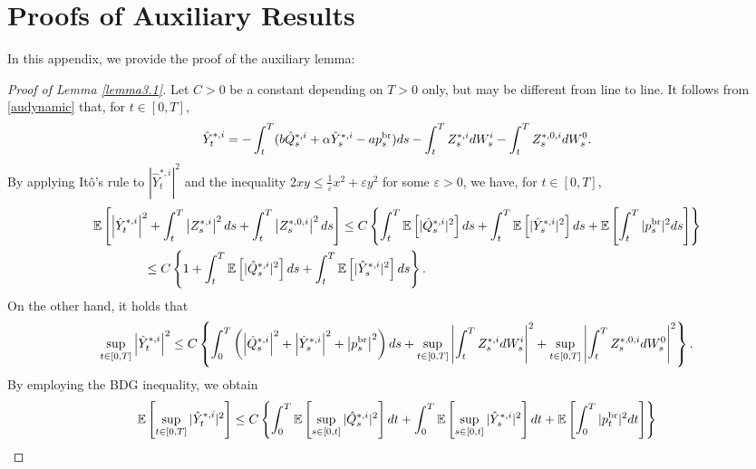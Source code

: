 \documentclass[11pt]{article}
\numberwithin{equation}{section}
\begin{document}
\appendix
\section{Proofs of Auxiliary Results}\label{sec:appendix}   	

In this appendix, we provide the proof of the auxiliary lemma:
{\small 
\begin{proof}[Proof of Lemma \ref{lemma3.1}]
Let $C>0$ be a constant depending on $T>0$ only, but may be different from line to line. It follows from \eqref{audynamic} that, for $t\in[0,T]$,
\begin{align*}
\hat{Y}_t^{*, i}=-\int_t^T(b \hat{Q}_s^{*, i}+\alpha  \hat{Y}_s^{*, i}-a p_s^{{\rm br}})ds-\int_t^T Z_s^{*,i}dW_s^i-\int_t^TZ_s^{*, 0, i}dW_s^0.    
\end{align*}
By applying It\^o’s rule to $|\hat{Y}_t^{*,i}|^2$ and %
the inequality $2xy\leq \frac{1}{\varepsilon}x^2+\varepsilon y^2$ for some $\varepsilon>0$, we have, for $t\in[0,T]$,
\begin{align*}
&\mathbb{E}\left[\left|\hat{Y}_t^{*, i}\right|^2+\int_t^T\left|Z_s^{*,i}\right|^2ds+\int_t^T\left|Z_s^{*,0,i}\right|^2ds\right]\leq C\left\{\int_t^T\mathbb{E}\left[|\hat{Q}_s^{*, i}|^2\right]ds+\int_t^T\mathbb{E}\left[|\hat{Y}_s^{*, i}|^2\right]ds+\mathbb{E}\left[\int_t^T|p_s^{{\rm br}}|^2ds\right]\right\}\nonumber\\
&\qquad\qquad\leq C\left\{1+\int_t^T\mathbb{E}\left[|\hat{Q}_s^{*, i}|^2\right]ds+\int_t^T\mathbb{E}\left[|\hat{Y}_s^{*, i}|^2\right]ds\right\}.
\end{align*}
On the other hand, it holds that
\begin{align*}
\sup_{t\in [0,T]}\left|\hat{Y}_t^{*, i}\right|^2\leq C\left\{\int_0^T\left(\left|\hat{Q}_s^{*, i}\right|^2+\left|\hat{Y}_s^{*,i}\right|^2+\left|p_s^{{\rm br}}\right|^2\right)ds+\sup_{t\in [0,T]}\left|\int_t^TZ_s^{*,i}dW_s^i\right|^2+\sup_{t\in [0,T]}\left|\int_t^TZ_s^{*, 0,i}dW_s^0\right|^2\right\}.
\end{align*}
By employing the BDG inequality, we obtain 
\begin{align}\label{est0}
\mathbb{E}\left[\sup_{t\in [0,T]}|\hat{Y}_t^{*, i}|^2\right]&\leq C\left\{\int_0^T\mathbb{E}\left[\sup_{s\in [0,t]}|\hat{Q}_s^{*, i}|^2\right]dt+\int_0^T\mathbb{E}\left[\sup_{s\in [0,t]}|\hat{Y}_s^{*, i}|^2\right]dt+\mathbb{E}\left[\int_0^T|p_t^{{\rm br}}|^2dt\right]\right\}\nonumber\\

\end{align}
\end{proof}}
\end{document}
